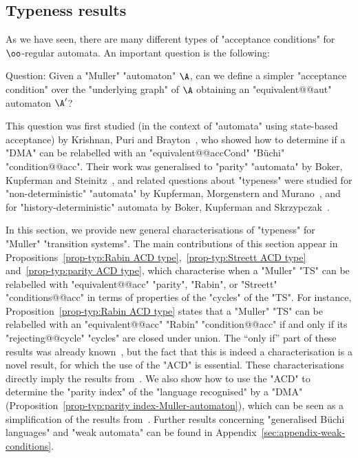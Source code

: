 \documentclass[10pt,a4paper]{amsart}
\begin{document}
\subsection{Typeness results}\label{subsec-corollaries:typeness}

As we have seen, there are many different types of "acceptance conditions" for $\oo$-regular automata. An important question is the following:

\begin{center}
	Question: Given a "Muller" "automaton" $\A$, can we define a simpler "acceptance condition" over the "underlying graph" of $\A$ obtaining an "equivalent@@aut" automaton $\A'$?
\end{center}

This question was first studied (in the context of "automata" using state-based acceptance) by Krishnan, Puri and Brayton~\cite{KPB94DetOmega,KPB95Structural}, who showed how to determine if a "DMA" can be relabelled with an "equivalent@@accCond" "B\"uchi" "condition@@acc". Their work was generalised to "parity" "automata" by Boker, Kupferman and Steinitz~\cite{BKS10Paritizing}, and related questions about "typeness" were studied for "non-deterministic" "automata" by Kupferman, Morgenstern and Murano~\cite{KMM06Typeness}, and for "history-deterministic" automata by Boker, Kupferman and Skrzypczak~\cite{BKS17HowDeterministicGFG}.

In this section, we provide new general characterisations of "typeness" for "Muller" "transition systems". The main contributions of this section appear in Propositions~\ref{prop-typ:Rabin ACD type},~\ref{prop-typ:Streett ACD type} and~\ref{prop-typ:parity ACD type}, which characterise when a "Muller" "TS" can be relabelled with "equivalent@@acc" "parity", "Rabin", or "Streett" "conditions@@acc" in terms of properties of the "cycles" of the "TS". For instance, Proposition~\ref{prop-typ:Rabin ACD type} states that a "Muller" "TS" can be relabelled with an "equivalent@@acc" "Rabin" "condition@@acc" if and only if its "rejecting@@cycle" "cycles" are closed under union. The ``only if'' part of these results was already known~\cite{Loding1999Optimal}, but the fact that this is indeed a characterisation is a novel result, for which the use of the "ACD" is essential. 
These characterisations directly imply the results from~\cite{BKS10Paritizing,KPB94DetOmega,KPB95Structural}.
We also show how to use the "ACD" to determine the "parity index" of the "language recognised" by a "DMA" (Proposition~\ref{prop-typ:parity index-Muller-automaton}), which can be seen as a simplification of the results from~\cite[Section~3.2]{KPB95Structural}. 
Further results concerning "generalised B\"uchi languages" and "weak automata" can be found in Appendix~\ref{sec:appendix-weak-conditions}.
\end{document}

